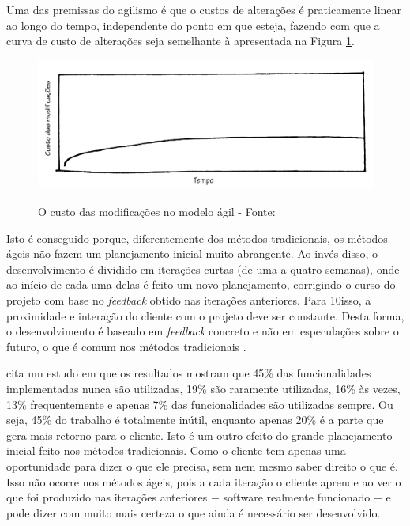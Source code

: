 Uma das premissas do agilismo é que o custos de alterações é praticamente linear ao longo do tempo, independente do ponto em que esteja, fazendo com que a curva de custo de alterações seja semelhante à apresentada na Figura \ref{img:custo-agile}.

\begin{figure}[h]
  \center
  \caption{O custo das modificações no modelo ágil - Fonte: \cite{XPKent}}
  \includegraphics[scale=0.45]{images/custo-agile}
  \label{img:custo-agile}
\end{figure}

Isto é conseguido porque, diferentemente dos métodos tradicionais, os métodos ágeis não fazem um planejamento inicial muito abrangente. Ao invés disso, o desenvolvimento é dividido em iterações curtas (de uma a quatro semanas), onde ao início de cada uma delas é feito um novo planejamento, corrigindo o curso do projeto com base no \textit{feedback} obtido nas iterações anteriores. Para 10isso, a proximidade e interação do cliente com o projeto deve ser constante. Desta forma, o desenvolvimento é baseado em \textit{feedback} concreto e não em especulações sobre o futuro, o que é comum nos métodos tradicionais \cite{BDDRodrigo}.

 cita um estudo em que os resultados mostram que 45\% das funcionalidades implementadas nunca são utilizadas, 19\% são raramente utilizadas, 16\% às vezes, 13\% frequentemente e apenas 7\% das funcionalidades são utilizadas sempre. Ou seja, 45\% do trabalho é totalmente inútil, enquanto apenas 20\% é a parte que gera mais retorno para o cliente. Isto é um outro efeito do grande planejamento inicial feito nos métodos tradicionais. Como o cliente tem apenas uma oportunidade para dizer o que ele precisa, sem nem mesmo saber direito o que é. Isso não ocorre nos métodos ágeis, pois a cada iteração o cliente aprende ao ver o que foi produzido nas iterações anteriores $-$ software realmente funcionado $-$ e pode dizer com muito mais certeza o que ainda é necessário ser desenvolvido.

